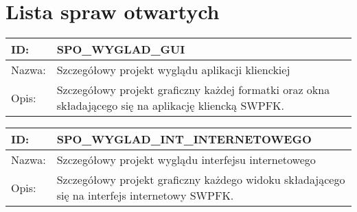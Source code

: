 \section{Lista spraw otwartych}
\begin{center}
\begin{tabular}[h]{|p{2cm}|p{13.1cm}|}
\hline
ID: & SPO\_WYGLAD\_GUI \\ \hline
Nazwa: & Szczegółowy projekt wyglądu aplikacji klienckiej \\ \hline
Opis: & Szczegółowy projekt graficzny każdej formatki oraz okna składającego się na aplikację kliencką SWPFK.\\
\hline
\end{tabular}
\end{center}

\begin{center}
\begin{tabular}[h]{|p{2cm}|p{13.1cm}|}
\hline
ID: & SPO\_WYGLAD\_INT\_INTERNETOWEGO \\ \hline
Nazwa: & Szczegółowy projekt wyglądu interfejsu internetowego \\ \hline
Opis: & Szczegółowy projekt graficzny każdego widoku składającego się na interfejs internetowy SWPFK. \\
\hline
\end{tabular}
\end{center}